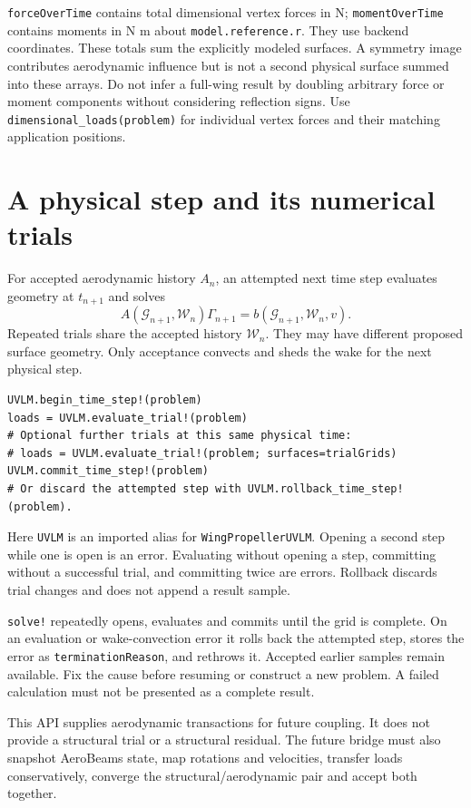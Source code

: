 \documentclass[11pt,a4paper]{article}
\newcommand{\code}{\nolinkurl}
\begin{document}
\code{forceOverTime} contains total dimensional vertex forces in N;
\code{momentOverTime} contains moments in N m about \code{model.reference.r}.
They use backend coordinates. These totals sum the explicitly modeled
surfaces. A symmetry image contributes aerodynamic influence but is not a
second physical surface summed into these arrays. Do not infer a full-wing
result by doubling arbitrary force or moment components without considering
reflection signs. Use \code{dimensional_loads(problem)} for individual vertex
forces and their matching application positions.

\section{A physical step and its numerical trials}

For accepted aerodynamic history $A_n$, an attempted next time step evaluates
geometry at $t_{n+1}$ and solves
\begin{equation}
 A(\mathcal G_{n+1},\mathcal W_n)\Gamma_{n+1}=b(\mathcal G_{n+1},\mathcal W_n,v).
\end{equation}
Repeated trials share the accepted history $\mathcal W_n$. They may have
different proposed surface geometry. Only acceptance convects and sheds the
wake for the next physical step.

\begin{lstlisting}
UVLM.begin_time_step!(problem)
loads = UVLM.evaluate_trial!(problem)
# Optional further trials at this same physical time:
# loads = UVLM.evaluate_trial!(problem; surfaces=trialGrids)
UVLM.commit_time_step!(problem)
# Or discard the attempted step with UVLM.rollback_time_step!(problem).
\end{lstlisting}
Here \code{UVLM} is an imported alias for \code{WingPropellerUVLM}. Opening a
second step while one is open is an error. Evaluating without opening a step,
committing without a successful trial, and committing twice are errors.
Rollback discards trial changes and does not append a result sample.

\code{solve!} repeatedly opens, evaluates and commits until the grid is
complete. On an evaluation or wake-convection error it rolls back the attempted
step, stores the error as \code{terminationReason}, and rethrows it. Accepted
earlier samples remain available. Fix the cause before resuming or construct
a new problem. A failed calculation must not be presented as a complete result.

This API supplies aerodynamic transactions for future coupling. It does not
provide a structural trial or a structural residual. The future bridge must
also snapshot AeroBeams state, map rotations and velocities, transfer loads
conservatively, converge the structural/aerodynamic pair and accept both together.
\end{document}
